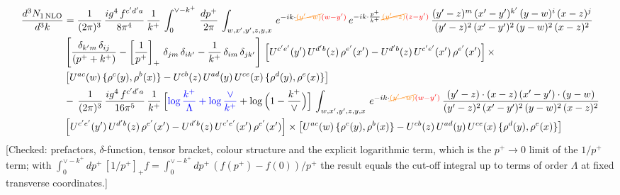 \documentclass[9pt]{article}
\numberwithin{equation}{section}
\begin{document}
\begin{align}
     \frac{d^{3}N_{1\,\rm NLO}}{d^{3}k} & = \frac{1}{(2\pi)^{3}}\, \frac{ig^{4}\,f^{c'd'a}}{8\pi^{4}}\, \frac{1}{k^{+}}\,\int_{0}^{\vee-k^{+}}\,  \frac{dp^{+}}{2\pi}\, \int_{w,x',y',z,y,x}\, e^{-ik\cdot {\color{orange}\cancel{(y'-w)}}{\color{red}(w-y')}}\, e^{-ik\cdot \frac{p^{+}}{k^{+}}\,{\color{orange}\cancel{(y'-z)}}{\color{red}(z-y')}}\,\frac{(y'-z)^{m}\,(x'-y')^{k'}\,(y-w)^{i}\,(x-z)^{j}}{(y'-z)^{2}\,(x'-y')^{2}\,(y-w)^{2}\,(x-z)^{2}}\notag \\ & \left[\frac{\delta_{k'm}\,\delta_{ij}}{(p^{+}+k^{+})}-\left[\frac{1}{p^{+}}\right]_{+}\,\delta_{jm}\,\delta_{ik'}-\frac{1}{k^{+}}\, \delta_{im}\, \delta_{jk'}\right]\, \left[U^{c'e'}(y')\,U^{d'b}(z)\,\rho^{e'}(x')-U^{d'b}(z)\,U^{c'e'}(x')\,\rho^{e'}(x')\right]\times\notag \\ &  \left[U^{ac}(w)\, \{\rho^{c}(y),\rho^{b}(x)\}-U^{cb}(z)\,U^{ad}(y)\,U^{ce}(x)\,\{\rho^{d}(y),\rho^{e}(x)\}\right]\notag \\ & -\,\frac{1}{(2\pi)^{3}}\, \frac{ig^{4}\,f^{c'd'a}}{16\pi^{5}}\, \frac{1}{k^{+}}\,\Big[{\color{blue}\log\frac{k^{+}}{\Lambda}+\log\frac{\vee}{k^{+}}}+\log\Big(1-\frac{k^{+}}{\vee}\Big)\Big]\, \int_{w,x',y',z,y,x}\, e^{-ik\cdot {\color{orange}\cancel{(y'-w)}}{\color{red}(w-y')}}\,\frac{(y'-z)\cdot (x-z)\,(x'-y')\cdot (y-w)}{(y'-z)^{2}\,(x'-y')^{2}\,(y-w)^{2}\,(x-z)^{2}}\notag \\ &  \left[U^{c'e'}(y')\,U^{d'b}(z)\,\rho^{e'}(x')-U^{d'b}(z)\,U^{c'e'}(x')\,\rho^{e'}(x')\right]\times  \left[U^{ac}(w)\, \{\rho^{c}(y),\rho^{b}(x)\}-U^{cb}(z)\,U^{ad}(y)\,U^{ce}(x)\,\{\rho^{d}(y),\rho^{e}(x)\}\right]
\end{align} {\color{red}[Checked: prefactors, $\delta$-function, tensor bracket, colour structure and the explicit logarithmic term, which is the $p^{+}\to 0$ limit of the $1/p^{+}$ term; with $\int_{0}^{\vee-k^{+}}dp^{+}\,[1/p^{+}]_{+}f=\int_{0}^{\vee-k^{+}}dp^{+}\,(f(p^{+})-f(0))/p^{+}$ the result equals the cut-off integral up to terms of order $\Lambda$ at fixed transverse coordinates.]}\par\noindent 
\end{document}
